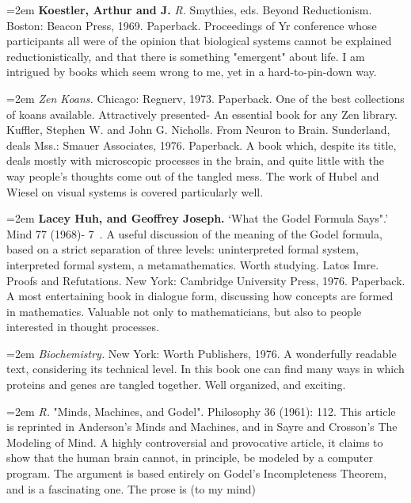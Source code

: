 \par\noindent\hangindent=2em {\bf Koestler, Arthur and J.} {\it R.} Smythies, eds. Beyond Reductionism. Boston: Beacon Press, 1969. Paperback. Proceedings of Yr conference whose participants all were of the opinion that biological systems cannot be explained reductionistically, and that there is something "emergent" about life. I am intrigued by books which seem wrong to me, yet in a hard-to-pin-down way.

\par\noindent\hangindent=2em  {\it Zen Koans.} Chicago: Regnerv, 1973. Paperback. One of the best collections of koans available. Attractively presented- An essential book for any Zen library. Kuffler, Stephen W. and John G. Nicholls. From Neuron to Brain. Sunderland, deals Mss.: Smauer Associates, 1976. Paperback. A book which, despite its title, deals mostly with microscopic processes in the brain, and quite little with the way people's thoughts come out of the tangled mess. The work of Hubel and Wiesel on visual systems is covered particularly well.

\par\noindent\hangindent=2em {\bf Lacey Huh, and Geoffrey Joseph.} `What the Godel Formula Says".' Mind 77 (1968)- 7~. A useful discussion of the meaning of the Godel formula, based on a strict separation of three levels: uninterpreted formal system, interpreted formal system, a metamathematics. Worth studying. Latos Imre. Proofs and Refutations. New York: Cambridge University Press, 1976. Paperback. A most entertaining book in dialogue form, discussing how concepts are formed in mathematics. Valuable not only to mathematicians, but also to people interested in thought processes.

\par\noindent\hangindent=2em  {\it Biochemistry.} New York: Worth Publishers, 1976. A wonderfully readable text, considering its technical level. In this book one can find many ways in which proteins and genes are tangled together. Well organized, and exciting.

\par\noindent\hangindent=2em  {\it R.} "Minds, Machines, and Godel". Philosophy 36 (1961): 112. This article is reprinted in Anderson's Minds and Machines, and in Sayre and Crosson's The Modeling of Mind. A highly controversial and provocative article, it claims to show that the human brain cannot, in principle, be modeled by a computer program. The argument is based entirely on Godel's Incompleteness Theorem, and is a fascinating one. The prose is (to my mind)

